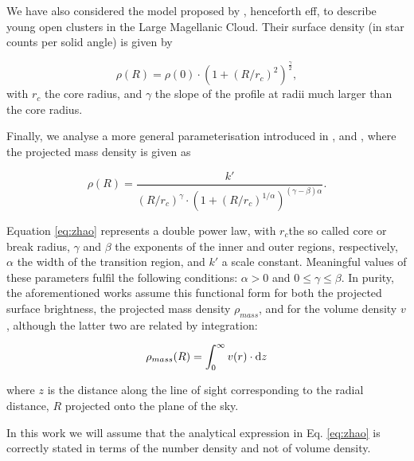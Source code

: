 We have also considered the model proposed by \citet{EFF1987}, henceforth \gls{eff},
to describe young open clusters in the Large
Magellanic Cloud. Their surface density (in star counts per solid
angle) is given by

\begin{equation}
\rho(R)=\rho(0)\cdot(1+(R/r_c)^2)^\frac{\gamma}{2},
\label{eq:eff}
\end{equation}
with $r_c$ the core radius, and $\gamma$ the slope of the profile at radii much larger than the core radius.

Finally, we analyse a more general parameterisation introduced in
\cite{1995AJ....110.2622L}, \cite{1996AJ....111.1889B} and
\cite{Zhao1997}, where the projected mass density is given as

\begin{equation}
  \rho(R) = \frac
      {k'}
      {(R/r_c)^{\gamma}\cdot(1+(R/r_c)^{1/\alpha})^{(\gamma-\beta)\alpha}}.
  \label{eq:zhao}
\end{equation}

Equation \ref{eq:zhao} represents a double power law, with $r_c$the so called core or break radius, $\gamma$
and $\beta$ the exponents of the inner and outer regions, respectively, $\alpha$ the width of the transition region, 
and $k'$ a scale constant. 
Meaningful values of these parameters fulfil the following conditions: $\alpha > 0$ and $0\leq \gamma \leq \beta$. 
In purity, the aforementioned works assume this functional form for both
the projected surface brightness, the projected mass density
$\rho_{mass}$, and for the volume density $v$, although the latter two are
related by integration:

\begin{equation}
  \rho_{mass}(R) = \int_{0}^{\infty}v(r)\cdot {\rm d}z  
\end{equation}

where $z$ is the distance along the line of sight corresponding to the radial distance, $R$ projected onto the plane of the sky.

In this work we will assume that the analytical expression in
Eq. \ref{eq:zhao} is correctly stated in terms of the number density
and not of volume density.

